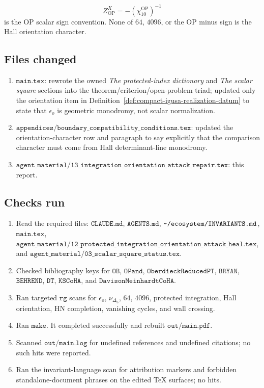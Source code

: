 \[
  Z^X_{\mathrm{OP}}=-(\chi_{10}^{\mathrm{OP}})^{-1}
\]
is the OP scalar sign convention.  None of \(64\), \(4096\), or the OP
minus sign is the Hall orientation character.

\subsection{Files changed}

\begin{enumerate}
\item \(\texttt{main.tex}\): rewrote the owned
\emph{The protected-index dictionary} and \emph{The scalar square}
sections into the theorem/criterion/open-problem triad; updated only the
orientation item in Definition~\ref{def:compact-igusa-realization-datum}
to state that \(\epsilon_o\) is geometric monodromy, not scalar
normalization.
\item \(\texttt{appendices/boundary\_compatibility\_conditions.tex}\):
updated the orientation-character row and paragraph to say explicitly
that the comparison character must come from Hall determinant-line
monodromy.
\item \(\texttt{agent\_material/13\_integration\_orientation\_attack\_repair.tex}\):
this report.
\end{enumerate}

\subsection{Checks run}

\begin{enumerate}
\item Read the required files:
\(\texttt{CLAUDE.md}\), \(\texttt{AGENTS.md}\),
\(\texttt{\string~/ecosystem/INVARIANTS.md}\), \(\texttt{main.tex}\),
\(\texttt{agent\_material/12\_protected\_integration\_orientation\_attack\_heal.tex}\),
and \(\texttt{agent\_material/03\_scalar\_square\_status.tex}\).
\item Checked bibliography keys for
\(\texttt{OB}\), \(\texttt{OPand}\),
\(\texttt{OberdieckReducedPT}\), \(\texttt{BRYAN}\),
\(\texttt{BEHREND}\), \(\texttt{DT}\),
\(\texttt{KSCoHA}\), and \(\texttt{DavisonMeinhardtCoHA}\).
\item Ran targeted \(\texttt{rg}\) scans for
\(\epsilon_o\), \(\nu_{\Delta_5}\), \(64\), \(4096\), protected
integration, Hall orientation, HN completion, vanishing cycles, and wall
crossing.
\item Ran \(\texttt{make}\).  It completed successfully and rebuilt
\(\texttt{out/main.pdf}\).
\item Scanned \(\texttt{out/main.log}\) for undefined references and
undefined citations; no such hits were reported.
\item Ran the invariant-language scan for attribution markers and forbidden
standalone-document phrases on the edited TeX surfaces; no hits.
\end{enumerate}

